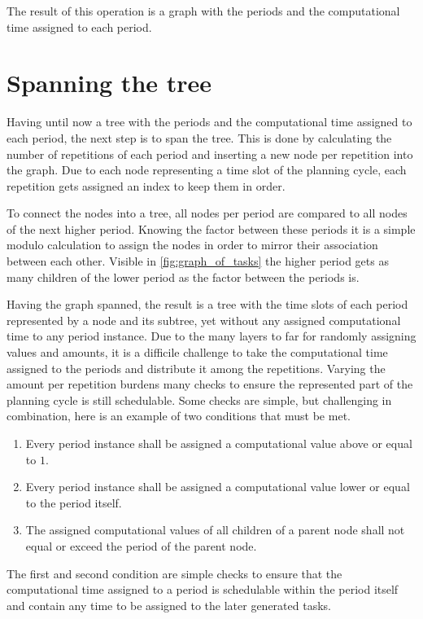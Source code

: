 The result of this operation is a graph with the periods and the computational time assigned to each period.

\section{Spanning the tree}\label{subsec:impl:spanning-the-tree}
Having until now a tree with the periods and the computational time assigned to each period, the next step is to span the tree.
This is done by calculating the number of repetitions of each period and inserting a new node per repetition into the graph.
Due to each node representing a time slot of the planning cycle, each repetition gets assigned an index to keep them in order.

To connect the nodes into a tree, all nodes per period are compared to all nodes of the next higher period.
Knowing the factor between these periods it is a simple modulo calculation to assign the nodes in order to mirror their association between each other.
Visible in \cref{fig:graph_of_tasks} the higher period gets as many children of the lower period as the factor between the periods is.

Having the graph spanned, the result is a tree with the time slots of each period represented by a node and its subtree, yet without any assigned computational time to any period instance.
Due to the many layers to far for randomly assigning values and amounts, it is a difficile challenge to take the computational time assigned to the periods and distribute it among the repetitions.
Varying the amount per repetition burdens many checks to ensure the represented part of the planning cycle is still schedulable.
Some checks are simple, but challenging in combination, here is an example of two conditions that must be met.

\begin{enumerate}
\item Every period instance shall be assigned a computational value above or equal to $1$.
\item Every period instance shall be assigned a computational value lower or equal to the period itself.
\item The assigned computational values of all children of a parent node shall not equal or exceed the period of the parent node.
\end{enumerate}

The first and second condition are simple checks to ensure that the computational time assigned to a period is schedulable within the period itself and contain any time to be assigned to the later generated tasks.


